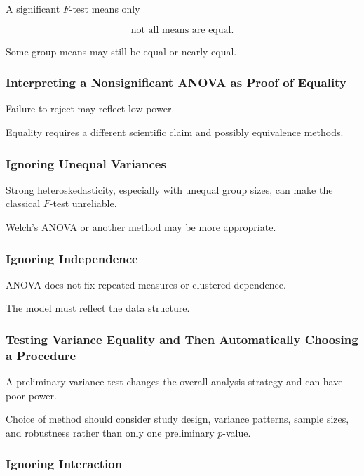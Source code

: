 A significant \(F\)-test means only

\[
\boxed{
\text{not all means are equal}.
}
\]

Some group means may still be equal or nearly equal.

\subsubsection{Interpreting a Nonsignificant ANOVA as Proof of Equality}

Failure to reject may reflect low power.

Equality requires a different scientific claim and possibly equivalence
methods.

\subsubsection{Ignoring Unequal Variances}

Strong heteroskedasticity, especially with unequal group sizes, can make
the classical \(F\)-test unreliable.

Welch's ANOVA or another method may be more appropriate.

\subsubsection{Ignoring Independence}

ANOVA does not fix repeated-measures or clustered dependence.

The model must reflect the data structure.

\subsubsection{Testing Variance Equality and Then Automatically Choosing a Procedure}

A preliminary variance test changes the overall analysis strategy and can
have poor power.

Choice of method should consider study design, variance patterns, sample
sizes, and robustness rather than only one preliminary \(p\)-value.

\subsubsection{Ignoring Interaction}

